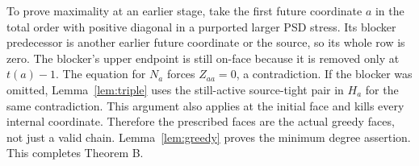 To prove maximality at an earlier stage, take the first future coordinate $a$ in the total order with positive diagonal in a purported larger PSD stress. Its blocker predecessor is another earlier future coordinate or the source, so its whole row is zero. The blocker's upper endpoint is still on-face because it is removed only at $t(a)-1$. The equation for $N_a$ forces $Z_{aa}=0$, a contradiction. If the blocker was omitted, Lemma~\ref{lem:triple} uses the still-active source-tight pair in $H_a$ for the same contradiction. This argument also applies at the initial face and kills every internal coordinate. Therefore the prescribed faces are the actual greedy faces, not just a valid chain. Lemma~\ref{lem:greedy} proves the minimum degree assertion. This completes Theorem B.
